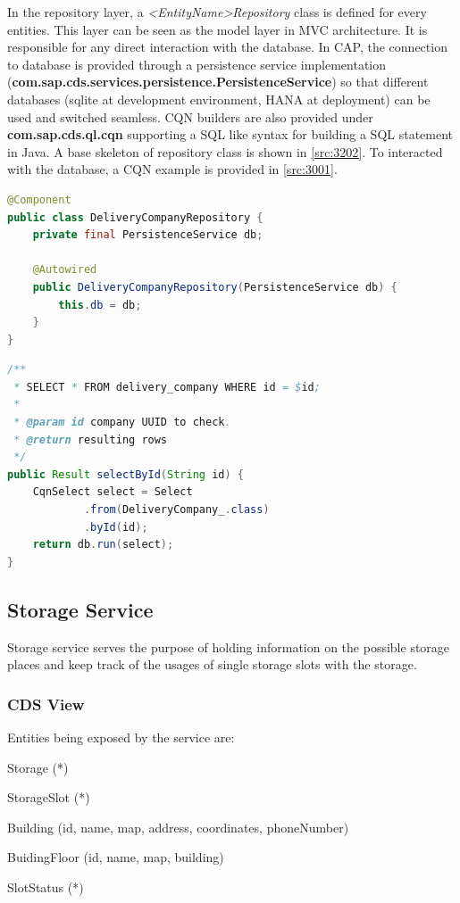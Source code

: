 \bigskip
In the repository layer, a \textit{<EntityName>Repository} class is defined for every entities. This layer can be seen as the model layer in MVC architecture. It is responsible for any direct interaction with the database. In CAP, the connection to database is provided through a persistence service implementation (\textbf{com.sap.cds.services.persistence.PersistenceService}) so that different databases (sqlite at development environment, HANA at deployment) can be used and switched seamless. CQN builders are also provided under \textbf{com.sap.cds.ql.cqn} supporting a SQL like syntax for building a SQL statement in Java.
A base skeleton of repository class is shown in \autoref{src:3202}.
To interacted with the database, a CQN example is provided in \autoref{src:3001}.

\begin{lstlisting}[language={java}]
@Component
public class DeliveryCompanyRepository {
    private final PersistenceService db;

    @Autowired
    public DeliveryCompanyRepository(PersistenceService db) {
        this.db = db;
    }
}
\end{lstlisting}

\begin{lstlisting}[language={java}]
/**
 * SELECT * FROM delivery_company WHERE id = $id;
 *
 * @param id company UUID to check.
 * @return resulting rows
 */
public Result selectById(String id) {
    CqnSelect select = Select
            .from(DeliveryCompany_.class)
            .byId(id);
    return db.run(select);
}
\end{lstlisting}



\subsection{Storage Service}
Storage service serves the purpose of holding information on the possible storage places and keep track of the usages of single storage slots with the storage. 

\subsubsection{CDS View}

Entities being exposed by the service are:
\begin{compactenum}
	\item Storage (*)
    \item StorageSlot (*)
    \item Building (id, name, map, address, coordinates, phoneNumber)
    \item BuidingFloor (id, name, map, building)
    \item SlotStatus (*)
\end{compactenum}

